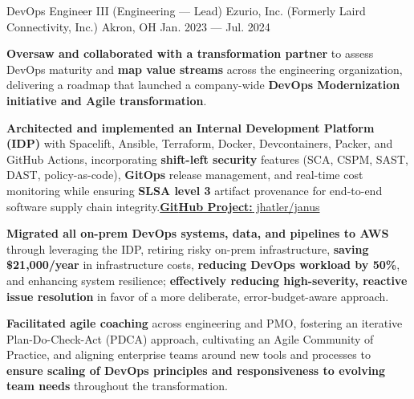 \begin{cventries}
    \cventry
        { DevOps Engineer III (Engineering --- Lead) }
        { Ezurio, Inc. (Formerly Laird Connectivity, Inc.) }
        { Akron, OH }
        { Jan. 2023 --- Jul. 2024 }
        {
            \begin{cvitems}
                \item{\textbf{Oversaw and collaborated with a transformation partner} to assess DevOps maturity and \textbf{map value streams} across the engineering organization, delivering a roadmap that launched a company-wide \textbf{DevOps Modernization initiative and Agile transformation}.}
                \item{\textbf{Architected and implemented an Internal Development Platform (IDP)} with Spacelift, Ansible, Terraform, Docker, Devcontainers, Packer, and GitHub Actions, incorporating \textbf{shift-left security} features (SCA, CSPM, SAST, DAST, policy-as-code), \textbf{GitOps} release management, and real-time cost monitoring while ensuring \textbf{SLSA level 3} artifact provenance for end-to-end software supply chain integrity.\hfill{\href{https://github.com/jhatler/janus}{\textbf{{\color{awesome}Git}Hub Project:} jhatler/janus}}}
                \item{\textbf{Migrated all on-prem DevOps systems, data, and pipelines to AWS} through leveraging the IDP, retiring risky on-prem infrastructure, \textbf{saving \$21,000/year} in infrastructure costs, \textbf{reducing DevOps workload by 50\%}, and enhancing system resilience; \textbf{effectively reducing high-severity, reactive issue resolution} in favor of a more deliberate, error-budget-aware approach.}
                \item{\textbf{Facilitated agile coaching} across engineering and PMO, fostering an iterative Plan-Do-Check-Act (PDCA) approach, cultivating an Agile Community of Practice, and aligning enterprise teams around new tools and processes to \textbf{ensure scaling of DevOps principles and responsiveness to evolving team needs} throughout the transformation.}
            \end{cvitems}
        }
\end{cventries}
